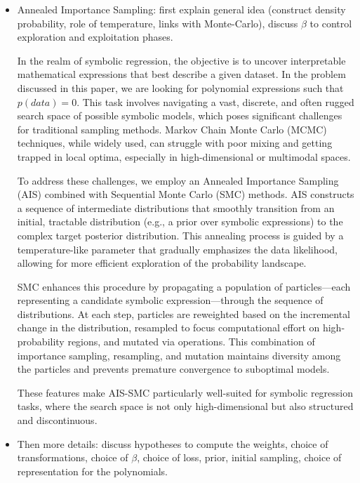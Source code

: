 \documentclass[11pt]{article}
\begin{document}
\begin{itemize}[label=\textbullet]
		\item Annealed Importance Sampling: first explain general idea (construct density probability, role of temperature, links with Monte-Carlo), discuss $\beta$ to control exploration and exploitation phases.
		
		In the realm of symbolic regression, the objective is to uncover interpretable mathematical expressions that best describe a given dataset. In the problem discussed in this paper, we are looking for polynomial expressions such that $p(data) = 0$. This task involves navigating a vast, discrete, and often rugged search space of possible symbolic models, which poses significant challenges for traditional sampling methods. Markov Chain Monte Carlo (MCMC) techniques, while widely used, can struggle with poor mixing and getting trapped in local optima, especially in high-dimensional or multimodal spaces.
		
		To address these challenges, we employ an Annealed Importance Sampling (AIS) combined with Sequential Monte Carlo (SMC) methods. AIS constructs a sequence of intermediate distributions that smoothly transition from an initial, tractable distribution (e.g., a prior over symbolic expressions) to the complex target posterior distribution. This annealing process is guided by a temperature-like parameter that gradually emphasizes the data likelihood, allowing for more efficient exploration of the probability landscape.
		
		SMC enhances this procedure by propagating a population of particles—each representing a candidate symbolic expression—through the sequence of distributions. At each step, particles are reweighted based on the incremental change in the distribution, resampled to focus computational effort on high-probability regions, and mutated via operations. This combination of importance sampling, resampling, and mutation maintains diversity among the particles and prevents premature convergence to suboptimal models.
		
		These features make AIS-SMC particularly well-suited for symbolic regression tasks, where the search space is not only high-dimensional but also structured and discontinuous. 
		
		\item Then more details: discuss hypotheses to compute the weights, choice of transformations, choice of $\beta$, choice of loss, prior, initial sampling, choice of representation for the polynomials.
		

\end{itemize}
\end{document}
